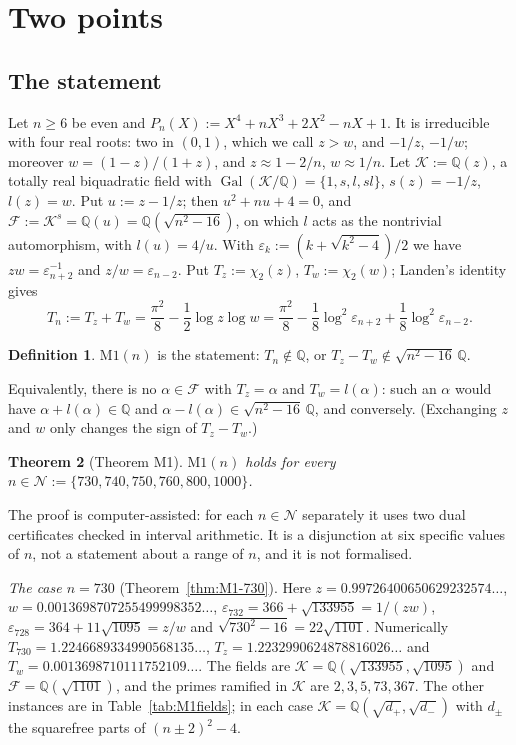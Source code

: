 \documentclass[11pt]{amsart}
\newtheorem{theorem}{Theorem}[section]
\theoremstyle{definition}
\newtheorem{definition}[theorem]{Definition}
\theoremstyle{remark}
\numberwithin{equation}{section}
\newcommand{\QQ}{\mathbb{Q}}
\newcommand{\cK}{\mathcal{K}}
\newcommand{\cF}{\mathcal{F}}
\newcommand{\eps}{\varepsilon}
\begin{document}
\section{Two points}\label{sec:M1}

\subsection{The statement}
Let $n\ge6$ be even and $P_n(X):=X^4+nX^3+2X^2-nX+1$. It is irreducible with four real roots: two in $(0,1)$, which we
call $z>w$, and $-1/z$, $-1/w$; moreover $w=(1-z)/(1+z)$, and $z\approx1-2/n$, $w\approx1/n$. Let $\cK:=\QQ(z)$, a totally
real biquadratic field with $\operatorname{Gal}(\cK/\QQ)=\{1,s,l,sl\}$, $s(z)=-1/z$, $l(z)=w$. Put $u:=z-1/z$; then
$u^2+nu+4=0$, and $\cF:=\cK^s=\QQ(u)=\QQ(\sqrt{n^2-16})$, on which $l$ acts as the nontrivial automorphism, with
$l(u)=4/u$. With $\eps_k:=(k+\sqrt{k^2-4})/2$ we have $zw=\eps_{n+2}^{-1}$ and $z/w=\eps_{n-2}$. Put $T_z:=\chi_2(z)$,
$T_w:=\chi_2(w)$; Landen's identity gives
\[
  T_n:=T_z+T_w=\frac{\pi^2}8-\frac12\log z\log w=\frac{\pi^2}8-\frac18\log^2\eps_{n+2}+\frac18\log^2\eps_{n-2}.
\]

\begin{definition}
$\mathrm{M1}(n)$ is the statement: $T_n\notin\QQ$, or $T_z-T_w\notin\sqrt{n^2-16}\,\QQ$.
\end{definition}

Equivalently, there is no $\alpha\in\cF$ with $T_z=\alpha$ and $T_w=l(\alpha)$: such an $\alpha$ would have
$\alpha+l(\alpha)\in\QQ$ and $\alpha-l(\alpha)\in\sqrt{n^2-16}\,\QQ$, and conversely. (Exchanging $z$ and $w$ only changes
the sign of $T_z-T_w$.)

\begin{theorem}[Theorem M1]\label{thm:M1}
$\mathrm{M1}(n)$ holds for every $n\in\mathcal N:=\{730,740,750,760,800,1000\}$.
\end{theorem}

The proof is computer-assisted: for each $n\in\mathcal N$ separately it uses two dual certificates checked in interval
arithmetic. It is a disjunction at six specific values of $n$, not a statement about a range of $n$, and it is not
formalised.

\emph{The case $n=730$} (Theorem~\ref{thm:M1-730}). Here $z=0.99726400650629232574\ldots$,
$w=0.0013698707255499998352\ldots$, $\eps_{732}=366+\sqrt{133955}=1/(zw)$, $\eps_{728}=364+11\sqrt{1095}=z/w$ and
$\sqrt{730^2-16}=22\sqrt{1101}$. Numerically $T_{730}=1.2246689334990568135\ldots$, $T_z=1.2232990624878816026\ldots$ and
$T_w=0.0013698710111752109\ldots$. The fields are $\cK=\QQ(\sqrt{133955},\sqrt{1095})$ and $\cF=\QQ(\sqrt{1101})$, and the
primes ramified in $\cK$ are $2,3,5,73,367$. The other instances are in Table~\ref{tab:M1fields}; in each case
$\cK=\QQ(\sqrt{d_+},\sqrt{d_-})$ with $d_\pm$ the squarefree parts of $(n\pm2)^2-4$.
\end{document}
